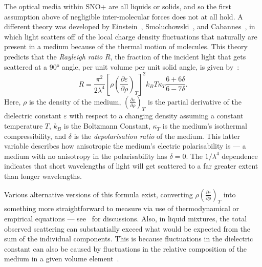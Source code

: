The optical media within SNO+ are all liquids or solids, and so the first assumption above of negligible inter-molecular forces does not at all hold. A different theory was developed by Einstein~\cite{einsteinTheoryOpalescenceHomogeneous1910}, %
Smoluchowski~\cite{smoluchowskiMolecularKineticTheory1908}, %
and Cabannes~\cite{cabannesRelationshipDegreePolarisation1920}, %
in which light scatters off of the local charge density fluctuations that naturally are present in a medium because of the thermal motion of molecules. This theory predicts that the \textit{Rayleigh ratio} $R$, the fraction of the incident light that gets scattered at a \ang{90} angle, per unit volume per unit solid angle, is given by~\cite{zhangEstimatingScatteringPure2009}:
\begin{equation}
    R = \frac{\pi^{2}}{2\lambda^{4}}\left[\rho\left(\frac{\partial\varepsilon}{\partial\rho}\right)_{T}\right]^{2} k_{B}T \kappa_{T}\frac{6+6\delta}{6-7\delta}.
\end{equation}
Here, $\rho$ is the density of the medium, $\left(\frac{\partial\varepsilon}{\partial\rho}\right)_{T}$ is the partial derivative of the dielectric constant $\varepsilon$ with respect to a changing density assuming a constant temperature $T$, $k_{B}$ is the Boltzmann Constant, $\kappa_{T}$ is the medium's isothermal compressibility, and $\delta$ is the \textit{depolarisation ratio} of the medium. This latter variable describes how anisotropic the medium's electric polarisability is --- a medium with no anisotropy in the polarisability has $\delta = 0$. The $1/\lambda^{4}$ dependence indicates that short wavelengths of light will get scattered to a far greater extent than longer wavelengths.

Various alternative versions of this formula exist, converting $\rho\left(\frac{\partial\varepsilon}{\partial\rho}\right)_{T}$ into something more straightforward to measure via use of thermodynamical or empirical equations --- see~\cite{zhangEstimatingScatteringPure2009,jiangbotimzhaoImprovedSpectrophotometricMethod2020} for discussions. Also, in liquid mixtures, the total observed scattering can substantially exceed what would be expected from the sum of the individual components. This is because fluctuations in the dielectric constant can also be caused by fluctuations in the relative composition of the medium in a given volume element~\cite{coumouIsotropicLightscatteringBinary1964,kirkwoodLightScatteringArising1950}.

